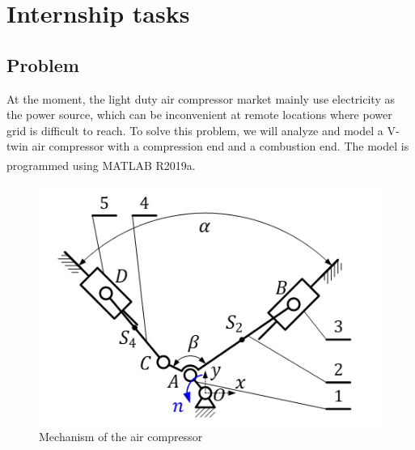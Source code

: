 \chapter{Internship tasks}

\section{Problem}
At the moment, the light duty air compressor market mainly use electricity as the power source, which can be inconvenient at remote locations where power grid is difficult to reach. To solve this problem, we will analyze and model a V-twin air compressor with a compression end and a combustion end. The model is programmed using MATLAB\textsuperscript{\textregistered} R2019a.
\begin{figure}[h]
	\centering
	\includegraphics[width=0.6\linewidth]{03}
	\caption{Mechanism of the air compressor}
	\label{fig:03}
\end{figure}
